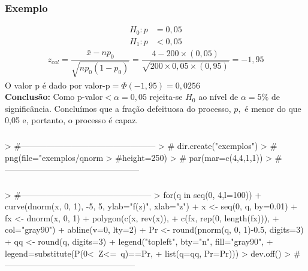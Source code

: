 \documentclass[14pt,aspectratio=1610]{beamer}
\newcommand{\bx}{\ensuremath{\bar{x}}}
\newcommand{\Ho}{\ensuremath{H_{0}}}
\begin{document}
\begin{frame}{}
\frametitle{Exemplo}
\begin{block}{}
\justifying
\begin{align*}
H_{0}: p&=0,05 \\ 
H_{1}: p&<0,05
\end{align*}
\begin{align}
z_{cal}=\dfrac{\bx-np_{0}}{\sqrt{np_{0}(1 - p_{0})}}=\dfrac{4-200\times(0,05)}{\sqrt{200\times0,05\times(0,95)}}=-1,95
\end{align}
O valor p é dado por valor-p$=\Phi(-1,95)=0,0256$\\
\textbf{Conclusão:} Como p-valor$<\alpha=0,05$ rejeita-se $\Ho$ ao nível de $\alpha=5\%$ de significância. Concluímos que a fração defeituosa do processo, $p,$ é 
menor do que 0,05 e, portanto, o processo é capaz.
\end{block}
\end{frame}

\begin{frame}[fragile]{}
\frametitle{}
\begin{block}{}
\begin{Schunk}
\begin{Sinput}
> #------------------------------------------------
> # dir.create("exemplos")
> # png(file="exemplos/qnorm%
> #height=250)
> # par(mar=c(4,4,1,1))
> #------------------------------------------------
\end{Sinput}
\end{Schunk}
\end{block}
\end{frame}

\begin{frame}[fragile]{}
\frametitle{}
\begin{block}{}
\begin{Schunk}
\begin{Sinput}
> #-----------------------------------------------
> for(q in seq(0, 4,l=100)){
+   curve(dnorm(x, 0, 1), -5, 5, ylab="f(z)", xlab="z")
+   x <- seq(0, q, by=0.01)
+   fx <- dnorm(x, 0, 1)
+   polygon(c(x, rev(x)),
+           c(fx, rep(0, length(fx))),
+           col="gray90")
+   abline(v=0, lty=2)
+   Pr <- round(pnorm(q, 0, 1)-0.5, digits=3)
+   qq <- round(q, digits=3)
+   legend("topleft", bty="n", fill="gray90",
+          legend=substitute(P(0<~Z<=~q)==Pr, 
+                            list(q=qq, Pr=Pr)))}
> dev.off()
> #-----------------------------------------------
\end{Sinput}
\end{Schunk}
\end{block}
\end{frame}
\end{document}
